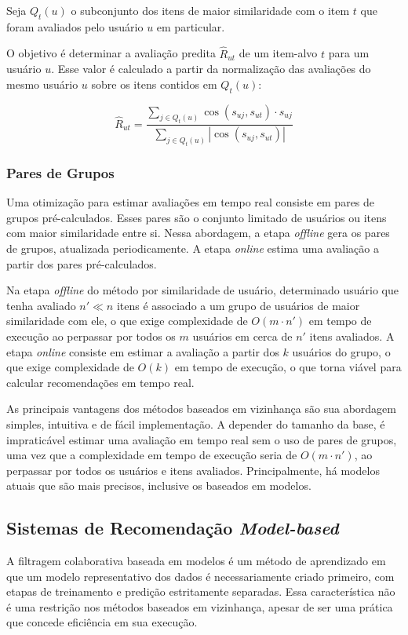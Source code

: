 Seja $Q_t (u)$ o subconjunto dos itens de maior similaridade com o item $t$ que
foram avaliados pelo usuário $u$ em particular.

O objetivo é determinar a avaliação predita $\hat{R}_{ut}$ de um item-alvo $t$ para um usuário
$u$. Esse valor é calculado a partir da normalização das avaliações do mesmo
usuário $u$ sobre os itens contidos em $Q_t (u)$:

\begin{equation}
    \hat{R}_{ut} = \frac{\sum_{j \in Q_t(u)} \cos(s_{uj},s_{ut}) \cdot s_{uj}}{\sum_{j \in Q_t(u)} |\cos(s_{uj},s_{ut})|}
\end{equation}

\subsubsection{Pares de Grupos}

Uma otimização para estimar avaliações em tempo real consiste em pares de grupos
pré-calculados. Esses pares são o conjunto limitado de usuários ou itens com
maior similaridade entre si. Nessa abordagem, a etapa \textit{offline} gera os
pares de grupos, atualizada periodicamente. A etapa \textit{online} estima uma
avaliação a partir dos pares pré-calculados.

Na etapa \textit{offline} do método por similaridade de usuário, determinado
usuário que tenha avaliado $n' \ll n$ itens é associado a um grupo de usuários
de maior similaridade com ele, o que exige complexidade de $O(m \cdot n')$ em
tempo de execução ao perpassar por todos os $m$ usuários em cerca de $n'$ itens
avaliados. A etapa \textit{online} consiste em estimar a avaliação a partir dos
$k$ usuários do grupo, o que exige complexidade de $O(k)$ em tempo de execução,
o que torna viável para calcular recomendações em tempo real.
 
As principais vantagens dos métodos baseados em vizinhança são sua abordagem
simples, intuitiva e de fácil implementação. A depender do tamanho da base, é
impraticável estimar uma avaliação em tempo real sem o uso de pares de grupos,
uma vez que a complexidade em tempo de execução seria de $O(m \cdot n')$, ao
perpassar por todos os usuários e itens avaliados. Principalmente, há modelos
atuais que são mais precisos, inclusive os baseados em modelos.

\subsection{Sistemas de Recomendação \textit{Model-based}}
A filtragem colaborativa baseada em modelos é um método de aprendizado em que um
modelo representativo dos dados é necessariamente criado primeiro, com etapas de
treinamento e predição estritamente separadas. Essa característica  não é uma
restrição nos métodos baseados em vizinhança, apesar de ser uma prática que
concede eficiência em sua execução.


